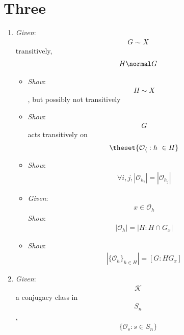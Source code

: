 \hypertarget{three}{%
\section{Three}\label{three}}

\begin{enumerate}
\def\labelenumi{\arabic{enumi}.}
\item
  \emph{Given}: \begin{align*}
  G \sim X\end{align*}
   transitively, \begin{align*}
  H \normal G\end{align*}

  \begin{itemize}
  \tightlist
  \item
    \emph{Show}: \begin{align*}
    H \sim X\end{align*}
    , but possibly not transitively
  \item
    \emph{Show}: \begin{align*}
    G\end{align*}
     acts transitively on \begin{align*}
    \theset{ \mathcal{O_h} : h\ \in H}\end{align*}
  \item
    \emph{Show}: \begin{align*}
    \forall i, j, |\mathcal{O}_{h_i}| = |\mathcal{O}_{h_j}|\end{align*}
  \item
    \emph{Given}: \begin{align*}
    x\in \mathcal{O}_h\end{align*}
     \emph{Show}: \begin{align*}
    |\mathcal{O}_h| = |H : H \cap G_x|\end{align*}
  \item
    \emph{Show}: \begin{align*}
    |\{\mathcal{O}_h\}_{h\in H}| = [G : HG_x]\end{align*}
  \end{itemize}
\item
  \emph{Given}: \begin{align*}
  \mathcal{K}\end{align*}
   a conjugacy class in \begin{align*}
  S_n\end{align*}
  , \begin{align*}
  \{\mathcal{O}_{s}:s\in S_n\}\end{align*}

\end{enumerate}
